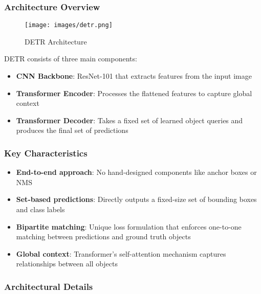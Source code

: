 \documentclass[12pt,a4paper]{article}
\begin{document}
\subsubsection{Architecture Overview}
\begin{figure}[H]
    \centering
    \texttt{[image: images/detr.png]}
    \caption{DETR Architecture}
    \label{fig:detr}
\end{figure}

DETR consists of three main components:
\begin{itemize}
    \item \textbf{CNN Backbone}: ResNet-101 that extracts features from the input image
    \item \textbf{Transformer Encoder}: Processes the flattened features to capture global context
    \item \textbf{Transformer Decoder}: Takes a fixed set of learned object queries and produces the final set of predictions
\end{itemize}

\subsubsection{Key Characteristics}
\begin{itemize}
    \item \textbf{End-to-end approach}: No hand-designed components like anchor boxes or NMS
    \item \textbf{Set-based predictions}: Directly outputs a fixed-size set of bounding boxes and class labels
    \item \textbf{Bipartite matching}: Unique loss formulation that enforces one-to-one matching between predictions and ground truth objects
    \item \textbf{Global context}: Transformer's self-attention mechanism captures relationships between all objects
\end{itemize}

\subsubsection{Architectural Details}
\end{document}
